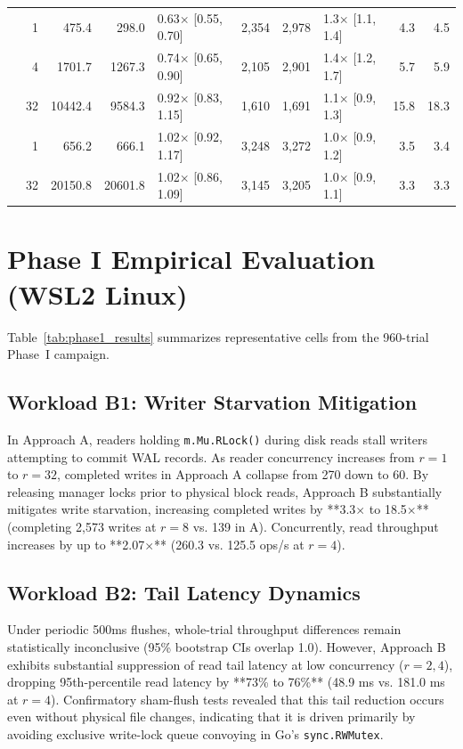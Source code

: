 \documentclass[conference]{IEEEtran}
\begin{document}
\begin{table}[t]
\begin{tabular}{@{}l r r r l r r l r r@{}}
\midrule
{}
& 1  & 475.4 & 298.0 & 0.63$\times$ [0.55, 0.70] & 2,354 & 2,978 & 1.3$\times$ [1.1, 1.4] & 4.3 & 4.5 \\
& 4  & 1701.7 & 1267.3 & 0.74$\times$ [0.65, 0.90] & 2,105 & 2,901 & 1.4$\times$ [1.2, 1.7] & 5.7 & 5.9 \\
& 32 & 10442.4 & 9584.3 & 0.92$\times$ [0.83, 1.15] & 1,610 & 1,691 & 1.1$\times$ [0.9, 1.3] & 15.8 & 18.3 \\
\midrule
{}
& 1  & 656.2  & 666.1  & 1.02$\times$ [0.92, 1.17] & 3,248 & 3,272 & 1.0$\times$ [0.9, 1.2] & 3.5 & 3.4 \\
& 32 & 20150.8 & 20601.8 & 1.02$\times$ [0.86, 1.09] & 3,145 & 3,205 & 1.0$\times$ [0.9, 1.1] & 3.3 & 3.3 \\
\bottomrule
\end{tabular}
\end{table}

\section{Phase I Empirical Evaluation (WSL2 Linux)}

Table~\ref{tab:phase1_results} summarizes representative cells from the 960-trial Phase~I campaign.

\subsection{Workload B1: Writer Starvation Mitigation}
In Approach A, readers holding \texttt{m.Mu.RLock()} during disk reads stall writers attempting to commit WAL records. As reader concurrency increases from $r=1$ to $r=32$, completed writes in Approach A collapse from 270 down to 60. By releasing manager locks prior to physical block reads, Approach B substantially mitigates write starvation, increasing completed writes by **3.3$\times$ to 18.5$\times$** (completing 2,573 writes at $r=8$ vs. 139 in A). Concurrently, read throughput increases by up to **2.07$\times$** (260.3 vs. 125.5 ops/s at $r=4$).

\subsection{Workload B2: Tail Latency Dynamics}
Under periodic 500ms flushes, whole-trial throughput differences remain statistically inconclusive (95\% bootstrap CIs overlap 1.0). However, Approach B exhibits substantial suppression of read tail latency at low concurrency ($r=2, 4$), dropping 95th-percentile read latency by **73\% to 76\%** (48.9 ms vs. 181.0 ms at $r=4$). Confirmatory sham-flush tests revealed that this tail reduction occurs even without physical file changes, indicating that it is driven primarily by avoiding exclusive write-lock queue convoying in Go's \texttt{sync.RWMutex}.
\end{document}

